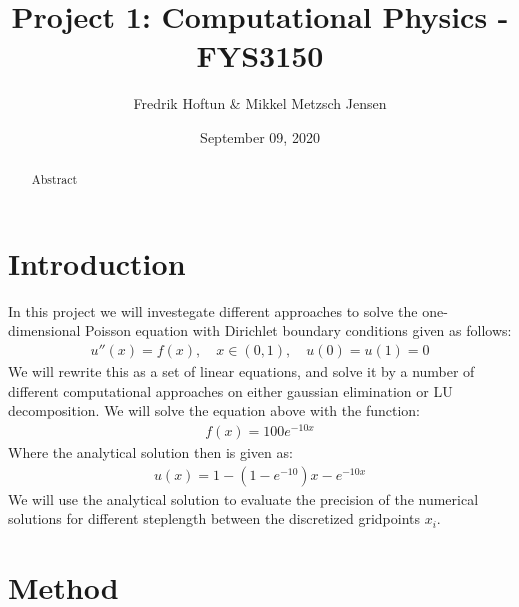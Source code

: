 \documentclass[american,a4paper,12pt]{article}
\title{Project 1: Computational Physics - FYS3150}
\author{Fredrik Hoftun \& Mikkel Metzsch Jensen}
\date{September 09, 2020}
\begin{document}
\maketitle


\begin{abstract}
    Abstract
\end{abstract}

\section{Introduction}
  In this project we will investegate different approaches to solve the one-dimensional Poisson equation with Dirichlet boundary conditions given as follows:
  \begin{align*}
    u''(x) = f(x), \quad x \in (0,1), \quad u(0) = u(1) = 0
  \end{align*}
  We will rewrite this as a set of linear equations, and solve it by a number of different computational approaches on either gaussian elimination or LU decomposition. We will solve the equation above with the function:
  \begin{align*}
    f(x) = 100e^{-10x}
  \end{align*}
  Where the analytical solution then is given as:
  \begin{align*}
    u(x) = 1 - (1 - e^{-10})x - e^{-10x}
  \end{align*}
  We will use the analytical solution to evaluate the precision of the numerical solutions for different steplength between the discretized gridpoints $x_i$.
\section{Method}
\end{document}
